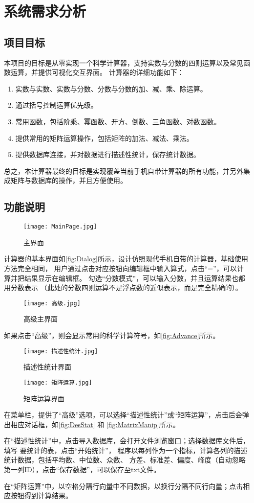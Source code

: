 \section{系统需求分析}

\subsection{项目目标}
本项目的目标是从零实现一个科学计算器，支持实数与分数的四则运算以及常见函数运算，并提供可视化交互界面。
计算器的详细功能如下：

\begin{enumerate}
    \item 实数与实数、实数与分数、分数与分数的加、减、乘、除运算。
    \item 通过括号控制运算优先级。
    \item 常用函数，包括阶乘、幂函数、开方、倒数、三角函数、对数函数。
    \item 提供常用的矩阵运算操作，包括矩阵的加法、减法、乘法。
    \item 提供数据库连接，并对数据进行描述性统计，保存统计数据。
\end{enumerate}

总之，本计算器最终的目标是实现覆盖当前手机自带计算器的所有功能，并另外集成矩阵与数据库的操作，并且方便使用。

\subsection{功能说明}

\begin{figure}[!htbp]
    \centering
    \texttt{[image: MainPage.jpg]}
    \caption{主界面}
    \label{fig:Dialog}
\end{figure}
计算器的基本界面如\autoref{fig:Dialog}所示，设计仿照现代手机自带的计算器，基础使用方法完全相同，
用户通过点击对应按钮向编辑框中输入算式，点击“=”，可以计算并把结果显示在编辑框。
勾选“分数模式”，可以输入分数，并且运算结果也都用分数表示
（此处的分数四则运算不是浮点数的近似表示，而是完全精确的）。

\begin{figure}[!htbp]
    \centering
    \texttt{[image: 高级.jpg]}
    \caption{高级主界面}
    \label{fig:Advance}
\end{figure}
如果点击“高级”，则会显示常用的科学计算符号，如\autoref{fig:Advance}所示。

\begin{figure}[!htbp]
    \centering
    \texttt{[image: 描述性统计.jpg]}
    \caption{描述性统计界面}
    \label{fig:DesStat}
\end{figure}
\begin{figure}[!htbp]
    \centering
    \texttt{[image: 矩阵运算.jpg]}
    \caption{矩阵运算界面}
    \label{fig:MatrixManip}
\end{figure}
在菜单栏，提供了“高级”选项，可以选择“描述性统计”或“矩阵运算”，点击后会弹出相应对话框，如\autoref{fig:DesStat} 和 
\autoref{fig:MatrixManip}所示。
   
在“描述性统计”中，点击导入数据库，会打开文件浏览窗口；选择数据库文件后，填写
要统计的表，点击“开始统计”，
程序以每列作为一个指标，计算各列的描述统计数据，包括平均数、中位数、众数、
方差、标准差、偏度、峰度（自动忽略第一列ID），点击“保存数据”，可以保存至txt文件。

在“矩阵运算”中，以空格分隔行向量中不同数据，以换行分隔不同行向量；点击相应按钮得到计算结果。